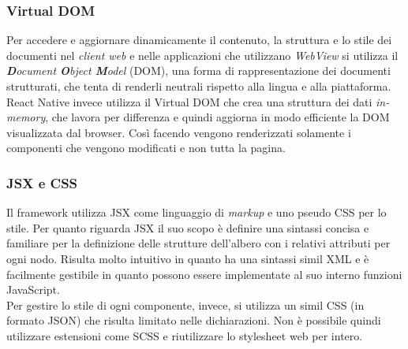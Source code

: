 \subsubsection{Virtual DOM}
Per accedere e aggiornare dinamicamente il contenuto, la struttura e lo stile dei documenti nel \emph{client web} e nelle applicazioni che utilizzano \emph{WebView} si utilizza il \emph{\textbf{D}ocument \textbf{O}bject \textbf{M}odel} (\acrshort{DOM}), una forma di rappresentazione dei documenti strutturati, che tenta di renderli neutrali rispetto alla lingua e alla piattaforma. React Native invece utilizza il Virtual DOM che crea una struttura dei dati\emph{ in-memory}, che lavora per differenza e quindi aggiorna in modo efficiente la DOM visualizzata dal browser. Così facendo vengono renderizzati solamente i componenti che vengono modificati e non tutta la pagina.
\subsubsection{JSX e CSS}
Il framework utilizza JSX come linguaggio di \emph{markup} e uno pseudo CSS per lo stile.
Per quanto riguarda JSX il suo scopo è definire una sintassi concisa e familiare per la definizione delle strutture dell'albero con i relativi attributi per ogni nodo. Risulta molto intuitivo in quanto ha una sintassi simil XML e è facilmente gestibile in quanto possono essere implementate al suo interno funzioni JavaScript.\\
Per gestire lo stile di ogni componente, invece,  si utilizza un simil CSS (in formato JSON) che risulta limitato nelle dichiarazioni. Non è possibile quindi utilizzare estensioni come SCSS e riutilizzare lo stylesheet web per intero. 

